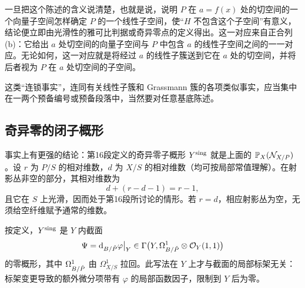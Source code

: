 一旦把这个陈述的含义说清楚，也就是说，说明 $P$ 在 $a=f(x)$ 处的切空间的一个向量子空间怎样确定 $P$ 的一个线性子空间，使“$H$ 不包含这个子空间”有意义，结论便立即由光滑性的雅可比判据或奇异零点的定义得出。这一对应来自正合列(b)：它给出 $a$ 处切空间的向量子空间与 $P$ 中包含 $a$ 的线性子空间之间的一一对应。无论如何，这一对应就是将经过 $a$ 的线性子簇送到它在 $a$ 处的切空间，并将后者视为 $P$ 在 $a$ 处切空间的子空间。

这类“连锁事实”，连同有关线性子簇和 Grassmann 簇的各项类似事实，应当集中在一两个预备编号或预备段落中，当然要对任意基底陈述。

\subsection*{奇异零的闭子概形}
事实上有更强的结论：第16段定义的奇异零子概形 $Y^{\mathrm{sing}}$ 就是上面的 $\mathbb P_X(\mathcal N_{X/P})$。设 $r$ 为 $P/S$ 的相对维数，$d$ 为 $X/S$ 的相对维数（均可按局部常值理解）。在射影丛非空的部分，其相对维数为
\[
 d+(r-d-1)=r-1,
\]
且它在 $S$ 上光滑，因而处于第16段所讨论的情形。若 $r=d$，相应射影丛为空，无须给空纤维赋予通常的维数。

按定义，$Y^{\mathrm{sing}}$ 是 $Y$ 内截面
\[
 \Psi=\mathrm d_{B/\check P}\varphi\big|_Y
 \in\Gamma\bigl(Y,\Omega^1_{B/\check P}\otimes\mathcal O_Y(1,1)\bigr)
\]
的零概形，其中 $\Omega^1_{B/\check P}$ 由 $\Omega^1_{X/S}$ 拉回。此写法在 $Y$ 上才与截面的局部标架无关：标架变更导致的额外微分项带有 $\varphi$ 的局部函数因子，限制到 $Y$ 后为零。

